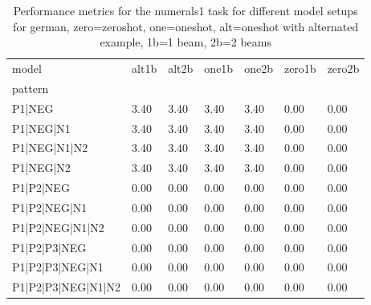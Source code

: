 \begin{table}[h]
\begin{tabular}{l|llllll}
\toprule
model & alt1b & alt2b & one1b & one2b & zero1b & zero2b \\
pattern &  &  &  &  &  &  \\
\midrule
P1|NEG & 3.40 & 3.40 & 3.40 & 3.40 & 0.00 & 0.00 \\
P1|NEG|N1 & 3.40 & 3.40 & 3.40 & 3.40 & 0.00 & 0.00 \\
P1|NEG|N1|N2 & 3.40 & 3.40 & 3.40 & 3.40 & 0.00 & 0.00 \\
P1|NEG|N2 & 3.40 & 3.40 & 3.40 & 3.40 & 0.00 & 0.00 \\
P1|P2|NEG & 0.00 & 0.00 & 0.00 & 0.00 & 0.00 & 0.00 \\
P1|P2|NEG|N1 & 0.00 & 0.00 & 0.00 & 0.00 & 0.00 & 0.00 \\
P1|P2|NEG|N1|N2 & 0.00 & 0.00 & 0.00 & 0.00 & 0.00 & 0.00 \\
P1|P2|P3|NEG & 0.00 & 0.00 & 0.00 & 0.00 & 0.00 & 0.00 \\
P1|P2|P3|NEG|N1 & 0.00 & 0.00 & 0.00 & 0.00 & 0.00 & 0.00 \\
P1|P2|P3|NEG|N1|N2 & 0.00 & 0.00 & 0.00 & 0.00 & 0.00 & 0.00 \\
\bottomrule
\end{tabular}
\caption{Performance metrics for the numerals1 task for different model setups for german, zero=zeroshot, one=oneshot, alt=oneshot with alternated example, 1b=1 beam, 2b=2 beams}
\label{tab:de_numerals1_performance}
\end{table}
